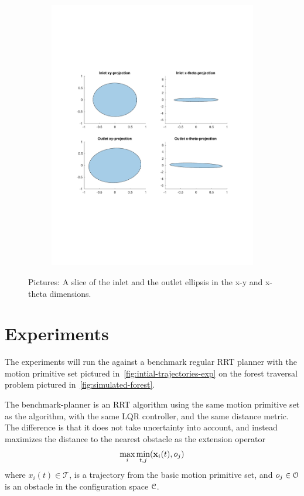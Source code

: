 \begin{figure}
\begin{subfigure}[b]{0.4\textwidth}
    \includegraphics[width=\textwidth]{figures/experiments/sos-calculation-inlet-outlet}
  \end{subfigure}
  \caption{Pictures: A slice of the inlet and the outlet ellipsis in the x-y and
    x-theta dimensions.}
  \label{fig:funnel-conv}
\end{figure}

\section{Experiments}
\label{sec:experiments-final}

The experiments will run the \rrtfunnel{} against a benchmark regular RRT
planner with the motion primitive set pictured
in~\cref{fig:intial-trajectories-exp} on the forest traversal problem pictured
in~\cref{fig:simulated-forest}.

The benchmark-planner is an \ac{RRT} algorithm using the same motion primitive
set as the \rrtfunnel{} algorithm, with the same \ac{LQR} controller, and the
same distance metric. The difference is that it does not take uncertainty into
account, and instead maximizes the distance to the nearest obstacle as the
extension operator \ie{}
\begin{equation}
  \max_{i}\min_{t,j}(\mathbf{x}_{i}(t), o_{j})
\end{equation}
where \(x_{i}(t) \in \mathcal{T}\), is a trajectory from the basic motion
primitive set, and \(o_{j} \in \mathcal{O}{}\) is an obstacle in the
configuration space \(\mathcal{C}{}\).

